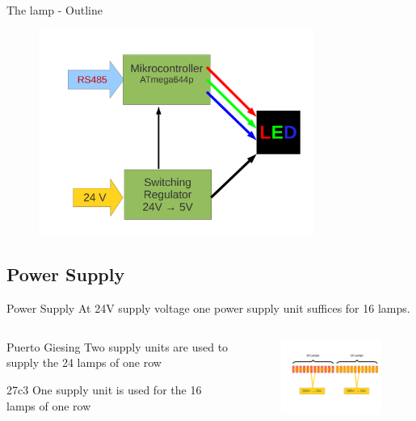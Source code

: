 \documentclass{beamer}
\begin{document}
  \begin{frame}{The lamp - Outline}
    \begin{figure}
    \begin{center}
    \includegraphics[width=9cm]{bilder/led_12v_rs485.pdf}
    \end{center}
    \end{figure}
  \end{frame}
\subsection{Power Supply}
  \begin{frame}{Power Supply}
  At 24V supply voltage one power supply unit suffices for 16 lamps.
  \begin{columns}
    \begin{column}{4cm}
     \begin{block}{ Puerto Giesing}
     Two supply units are used to supply the 24 lamps of one row
     \end{block}
     \begin{block}{27c3}
     One supply unit is used for the 16 lamps of one row
     \end{block}
    \end{column}
    \begin{column}{7cm}
    \begin{figure}
    \includegraphics[width=7cm, clip, trim= 2.5cm 4.6cm 0.5cm 4cm]{bilder/12lampen.pdf}
    \end{figure}
    \end{column}
  \end{columns}
  \end{frame}
\end{document}
